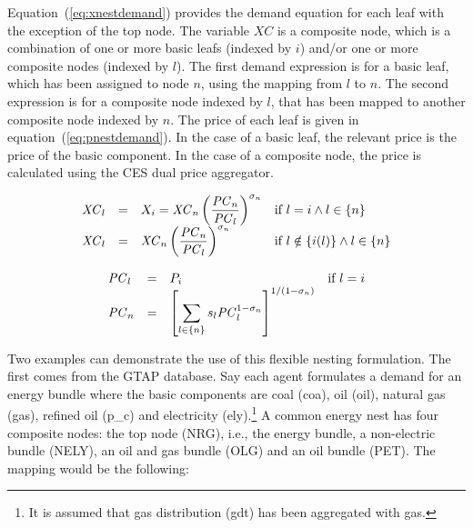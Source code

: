 Equation~(\ref{eq:xnestdemand}) provides the
demand equation for each leaf with the exception of the
top node. The variable $\mathit{XC}$ is a composite node,
which is a combination of one or more basic leafs (indexed
by $i$) and/or one or more composite nodes (indexed by $l$).
The first demand expression is for a basic leaf, which
has been assigned to node $n$, using the mapping from $l$
to $n$. The second expression is for a composite node
indexed by $l$,
that has been mapped to another composite node indexed by $n$.
The price of each leaf is given in equation~(\ref{eq:pnestdemand}).
In the case of a basic leaf, the relevant price is the
price of the basic component. In the case of a
composite node, the price is calculated using
the CES dual price aggregator.

\begin{equation}
\label{eq:xnestdemand}
\begin{array}{lcll}
\mathit{XC}_l  & = & X_i = \mathit{XC}_n \displaystyle
\left(\frac{\mathit{PC}_n}{\mathit{PC}_l}\right)^{\sigma_n}
& \textnormal{if } l=i \land l \in \{n\} \\
\mathit{XC}_l & = & \mathit{XC}_n \displaystyle \left(\frac{\mathit{PC}_n}{\mathit{PC}_l}\right)^{\sigma_n}
& \textnormal{if } l \notin \{i(l)\}  \land l \in \{n\} \\
\end{array}
\end{equation}

\begin{equation}
	\label{eq:pnestdemand}
\begin{array}{lcll}
	\mathit{PC}_l & = & {P_i}
	& \textnormal{if } l=i \\
	\mathit{PC}_n & = & \left[\displaystyle
	\sum_{l \in \{n\}}{s_l \mathit{PC}_l^{1-\sigma_n}}
	\right]^{1/(1-\sigma_n)}
	& {}  \\
\end{array}
\end{equation}

Two examples can demonstrate the use of this flexible nesting
formulation. The first comes from the GTAP database. Say
each agent formulates a demand for an energy bundle
where the basic components are coal (coa), oil (oil), natural
gas (gas), refined oil (p\_c) and electricity (ely).\footnote{It is assumed that gas distribution (gdt) has been aggregated
with gas.} A common energy nest has four composite nodes:
the top node (NRG), i.e., the energy bundle, a non-electric
bundle (NELY), an oil and gas bundle (OLG) and an oil bundle (PET). The mapping would be the following:

